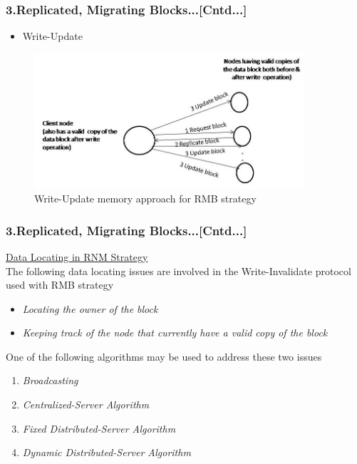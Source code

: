 \documentclass{beamer}
\begin{document}
\begin{frame}
	\frametitle{3.Replicated, Migrating Blocks...[Cntd...]}
	\vspace{0.25cm}
	\begin{itemize}
		\item Write-Update
	\end{itemize}
	\begin{figure}
		\centering
		\includegraphics[width=10cm]{fig510.jpg}
		\caption{Write-Update memory approach for RMB strategy}
		\label{fig510}
	\end{figure}
\end{frame}


\begin{frame}
	\frametitle{3.Replicated, Migrating Blocks...[Cntd...]}
	\vspace{0.25cm}
	\underline{Data Locating in RNM Strategy}\\
	\vspace{0.5cm}
	The following data locating issues are involved in the Write-Invalidate protocol used with RMB strategy
	\begin{itemize}
		\item \textit{Locating the owner of the block}
		\item \textit{Keeping track of the node that currently have a valid copy of the block}
	\end{itemize}
	One of the following algorithms may be used to address these two issues\\
	\begin{enumerate}
		\item \textit{Broadcasting}
		\item \textit{Centralized-Server Algorithm}
		\item \textit{Fixed Distributed-Server Algorithm}
		\item \textit{Dynamic Distributed-Server Algorithm}
	\end{enumerate}
\end{frame}
\end{document}
